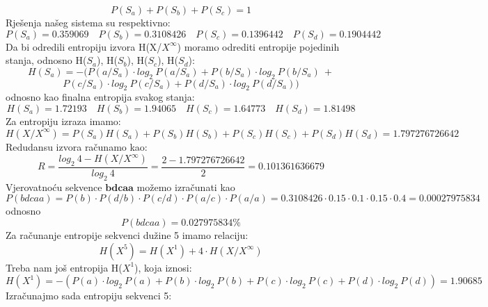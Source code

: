 \documentclass[12pt]{article}
\begin{document}
\begin{enumerate}
\begin{equation*}
    P(S_a) + P(S_b) + P(S_c) = 1
\end{equation*}
Rješenja našeg sistema su respektivno:
\begin{equation*}
    P(S_a) = 0.359069 \quad P(S_b) = 0.3108426 \quad P(S_c) = 0.1396442 \quad P(S_d) = 0.1904442
\end{equation*}
\newpage
Da bi odredili entropiju izvora H(X/$X^{\infty}$) moramo odrediti entropije pojedinih stanja, odnosno H($S_a$), H($S_b$), H($S_c$), H($S_d$):
\begin{equation*}
    H(S_a) =  - (P(a/S_a) \cdot log_2~P(a/S_a) + P(b/S_a) \cdot log_2~P(b/S_a)~+
\end{equation*}
\begin{equation*}
    P(c/S_a) \cdot log_2~P(c/S_a) + P(d/S_a) \cdot log_2~P(d/S_a))
\end{equation*}
odnosno kao finalna entropija svakog stanja:
\begin{equation*}
    H(S_a) = 1.72193 \quad H(S_b) = 1.94065 \quad H(S_c) = 1.64773 \quad H(S_d) = 1.81498
\end{equation*}
Za entropiju izraza imamo:
\begin{equation*}
    H(X/X^\infty) = P(S_a)H(S_a) + P(S_b)H(S_b) + P(S_c)H(S_c) + P(S_d)H(S_d) = 1.797276726642
\end{equation*}
Redudansu izvora računamo kao:
\begin{equation*}
    R = \frac{log_2~4 - H(X/X^\infty)}{log_2~4} = \frac{2 - 1.797276726642}{2} = 0.101361636679
\end{equation*}
Vjerovatnoću sekvence ${\boldsymbol{bdcaa}}$ možemo izračunati kao
\begin{equation*}
    P(bdcaa) = P(b) \cdot P(d/b) \cdot P(c/d) \cdot P(a/c) \cdot P(a/a) = 0.3108426 \cdot 0.15 \cdot 0.1 \cdot 0.15 \cdot 0.4 = 0.00027975834
\end{equation*}
odnosno 
\begin{equation*}
    P(bdcaa) = 0.027975834\%
\end{equation*}
Za računanje entropije sekvenci dužine 5 imamo relaciju:
\begin{equation*}
    H(X^5) = H(X^1) + 4 \cdot H(X/X^\infty) 
\end{equation*}
Treba nam još entropija H($X^1$), koja iznosi:
\begin{equation*}
    H(X^1) = -(P(a) \cdot log_2~P(a) + P(b) \cdot log_2~P(b) + P(c) \cdot log_2~P(c) + P(d) \cdot log_2~P(d)) = 1.90685
\end{equation*}
Izračunajmo sada entropiju sekvenci 5:

\end{enumerate}
\end{document}
